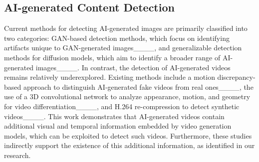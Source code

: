 \subsection{AI-generated Content Detection}


Current methods for detecting AI-generated images are primarily classified into two categories: GAN-based detection methods, which focus on identifying artifacts unique to GAN-generated images____, and generalizable detection methods for diffusion models, which aim to identify a broader range of AI-generated images____. In contrast, the detection of AI-generated videos remains relatively underexplored. Existing methods include a motion discrepancy-based approach to distinguish AI-generated fake videos from real ones____, the use of a 3D convolutional network to analyze appearance, motion, and geometry for video differentiation____, and H.264 re-compression to detect synthetic videos____. This work demonstrates that AI-generated videos contain additional visual and temporal information embedded by video generation models, which can be exploited to detect such videos. Furthermore, these studies indirectly support the existence of this additional information, as identified in our research.